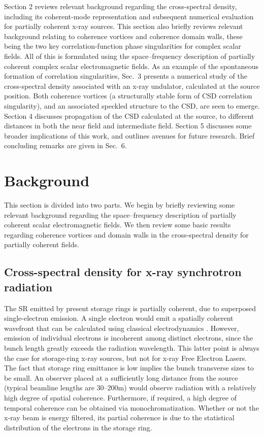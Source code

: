 \documentclass[%
 reprint,
 amsmath,amssymb,
 aps,
]{revtex4-1}
\begin{document}
Section 2 reviews relevant background regarding the cross-spectral density, including its coherent-mode representation and subsequent numerical evaluation for partially coherent x-ray sources.  This section also briefly reviews relevant background relating to coherence vortices and coherence domain walls, these being the two key correlation-function phase singularities for complex scalar fields.  All of this is formulated using the space--frequency description of partially coherent complex scalar electromagnetic fields.  As an example of the spontaneous formation of correlation singularities, Sec.~3 presents a numerical study of the cross-spectral density associated with an x-ray undulator, calculated at the source position.  Both coherence vortices (a structurally stable form of CSD correlation singularity), and an associated speckled structure to the CSD, are seen to emerge. Section 4 discusses propagation of the CSD calculated at the source, to different distances in both the near field and intermediate field. Section 5 discusses some broader implications of this work, and outlines avenues for future research.  Brief concluding remarks are given in Sec.~6.

\section{Background}

This section is divided into two parts.  We begin by briefly reviewing some relevant background regarding the space--frequency description of partially coherent scalar electromagnetic fields.  We then review some basic results regarding coherence vortices and domain walls in the cross-spectral density for partially coherent fields.  
\subsection{Cross-spectral density for x-ray synchrotron radiation}

The SR emitted by present storage rings is partially coherent, due to superposed single-electron emission. A single electron would emit a spatially coherent wavefront that can be calculated using classical electrodynamics \cite{jackson}. However, emission of individual electrons is incoherent among distinct electrons, since the bunch length greatly exceeds the radiation wavelength.  This latter point is always the case for storage-ring x-ray sources, but not for x-ray Free Electron Lasers. The fact that storage ring emittance is low implies the bunch transverse sizes to be small. An observer placed at a sufficiently long distance from the source (typical beamline lengths are 30--200m) would observe  radiation with a relatively high degree of  spatial coherence. Furthermore, if required, a high degree of temporal coherence can be obtained via monochromatization.  Whether or not the x-ray beam is energy filtered, its partial coherence is due to the statistical distribution of the electrons in the storage ring. 
\end{document}
